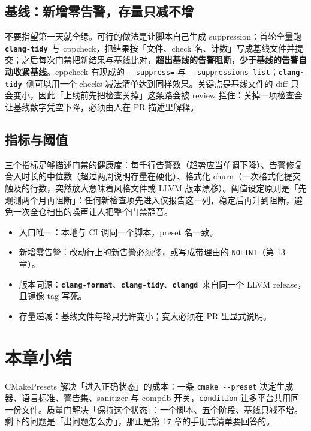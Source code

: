 \documentclass[12pt,a4paper,fontset=fandol]{ctexbook}
\newcommand{\Opt}[1]{\texttt{-\/-#1}}
\newcommand{\Lib}[1]{\textbf{\texttt{#1}}}
\newcommand{\Tidy}{\Lib{clang-tidy}}
\newcommand{\Fmt}{\Lib{clang-format}}
\newcommand{\CD}{\Lib{clangd}}
\begin{document}
\subsection{基线：新增零告警，存量只减不增}

不要指望第一天就全绿。可行的做法是让脚本自己生成 suppression：首轮全量跑 \Tidy\ 与 cppcheck，把结果按「文件、check 名、计数」写成基线文件并提交；之后每次门禁把新结果与基线比对，\textbf{超出基线的告警阻断，少于基线的告警自动收紧基线}。cppcheck 有现成的 \Opt{suppress=} 与 \Opt{suppressions-list}；\Tidy\ 侧可以用一个 checks 减法清单达到同样效果。关键点是基线文件的 diff 只会变小，因此「上线前先把检查关掉」这条路会被 review 拦住：关掉一项检查会让基线数字凭空下降，必须由人在 PR 描述里解释。

\subsection{指标与阈值}

三个指标足够描述门禁的健康度：每千行告警数（趋势应当单调下降）、告警修复合入时长的中位数（超过两周说明存量在硬化）、格式化 churn（一次格式化提交触及的行数，突然放大意味着风格文件或 LLVM 版本漂移）。阈值设定原则是「先观测两个月再阻断」：任何新检查项先进入仅报告这一列，稳定后再升到阻断，避免一次全仓扫出的噪声让人把整个门禁静音。

\begin{guideline}[title={门禁的四条不变量}]
\begin{itemize}
  \item 入口唯一：本地与 CI 调同一个脚本，preset 名一致。
  \item 新增零告警：改动行上的新告警必须修，或写成带理由的 \texttt{NOLINT}（第 13 章）。
  \item 版本同源：\Fmt、\Tidy、\CD\ 来自同一个 LLVM release，且镜像 tag 写死。
  \item 存量递减：基线文件每轮只允许变小；变大必须在 PR 里显式说明。
\end{itemize}
\end{guideline}

\section{本章小结}\label{sec:ch16-s11}

CMakePresets 解决「进入正确状态」的成本：一条 \texttt{cmake}~\Opt{preset} 决定生成器、语言标准、警告集、sanitizer 与 compdb 开关，\texttt{condition} 让多平台共用同一份文件。质量门解决「保持这个状态」：一个脚本、五个阶段、基线只减不增。剩下的问题是「出问题怎么办」，那正是第 17 章的手册式清单要回答的。
\end{document}

